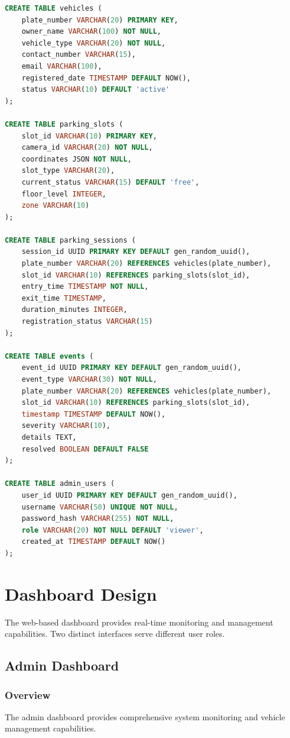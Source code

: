 \documentclass[12pt,a4paper]{report}
\begin{document}
\begin{lstlisting}[language=SQL, caption=Database Creation Script]
CREATE TABLE vehicles (
    plate_number VARCHAR(20) PRIMARY KEY,
    owner_name VARCHAR(100) NOT NULL,
    vehicle_type VARCHAR(20) NOT NULL,
    contact_number VARCHAR(15),
    email VARCHAR(100),
    registered_date TIMESTAMP DEFAULT NOW(),
    status VARCHAR(10) DEFAULT 'active'
);

CREATE TABLE parking_slots (
    slot_id VARCHAR(10) PRIMARY KEY,
    camera_id VARCHAR(20) NOT NULL,
    coordinates JSON NOT NULL,
    slot_type VARCHAR(20),
    current_status VARCHAR(15) DEFAULT 'free',
    floor_level INTEGER,
    zone VARCHAR(10)
);

CREATE TABLE parking_sessions (
    session_id UUID PRIMARY KEY DEFAULT gen_random_uuid(),
    plate_number VARCHAR(20) REFERENCES vehicles(plate_number),
    slot_id VARCHAR(10) REFERENCES parking_slots(slot_id),
    entry_time TIMESTAMP NOT NULL,
    exit_time TIMESTAMP,
    duration_minutes INTEGER,
    registration_status VARCHAR(15)
);

CREATE TABLE events (
    event_id UUID PRIMARY KEY DEFAULT gen_random_uuid(),
    event_type VARCHAR(30) NOT NULL,
    plate_number VARCHAR(20) REFERENCES vehicles(plate_number),
    slot_id VARCHAR(10) REFERENCES parking_slots(slot_id),
    timestamp TIMESTAMP DEFAULT NOW(),
    severity VARCHAR(10),
    details TEXT,
    resolved BOOLEAN DEFAULT FALSE
);

CREATE TABLE admin_users (
    user_id UUID PRIMARY KEY DEFAULT gen_random_uuid(),
    username VARCHAR(50) UNIQUE NOT NULL,
    password_hash VARCHAR(255) NOT NULL,
    role VARCHAR(20) NOT NULL DEFAULT 'viewer',
    created_at TIMESTAMP DEFAULT NOW()
);
\end{lstlisting}


\chapter{Dashboard Design}

The web-based dashboard provides real-time monitoring and management capabilities. Two distinct interfaces serve different user roles.

\section{Admin Dashboard}

\subsection{Overview}
The admin dashboard provides comprehensive system monitoring and vehicle management capabilities.
\end{document}
